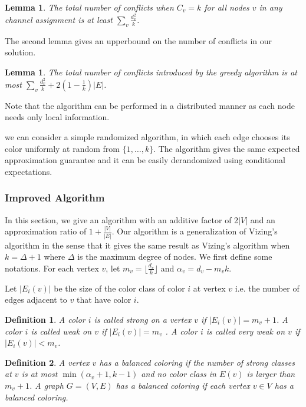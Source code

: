 \documentclass[titlepage, 11pt]{article}
\newtheorem{definition}{Definition}
\newtheorem{lemma}[theorem]{Lemma}
\begin{document}
\begin{lemma}
The total number of conflicts when $C_v = k$ for all nodes $v$ in any channel assignment
is at least
$    \sum_{v}\frac{d_v^2} {k} $.
\label{lemma:lower}
\end{lemma}

The second lemma gives an upperbound on the number of conflicts in our solution.
\begin{lemma}
The total number of conflicts introduced by the greedy algorithm is at most 
$    \sum_{v}\frac{d_v^2} {k} + 2(1 -\frac{1}{k})|E|$.
\label{lemma:upper}
\end{lemma}
Note that the algorithm can be performed in a distributed manner as each node needs only local information. 

 we can consider a simple randomized algorithm, in which each edge
chooses its color uniformly at random from $\{1, \dots, k\}$. 
The algorithm gives the same expected approximation guarantee and
it can be easily derandomized using conditional expectations.  \\



\subsubsection{Improved Algorithm}
\label{sec:improv}
In this section, we give an algorithm with an additive factor of 2$|V|$ and an approximation ratio of  $1 + \frac{|V|}{|E|}$. Our algorithm is a generalization of Vizing's algorithm in the sense that
it gives the same result as Vizing's algorithm  when $k = \Delta + 1$ where $\Delta$ is the maximum degree of nodes. 
We first define some notations. For each vertex $v$, let $m_v = \lfloor \frac{d_v}{k} \rfloor$ and $\alpha_v = d_v  -  m_vk $.

Let $|E_i(v)|$ be the size of the color class of color $i$ at vertex $v$ i.e. the number of edges adjacent to $v$ that have color $i$.

\begin{definition}
A color $i$ is called \emph{strong} on a vertex $v$ if $|E_i(v)|= m_v + 1$. A color $i$ is called weak on $v$ 
if $|E_i(v)| =  m_v$ . A color $i$ is called very weak on $v$ if $|E_i(v)| < m_v$.
\end{definition}
\begin{definition}
A vertex $v$ has a \emph{balanced} coloring if the number of strong classes at $v$ is at most $\min(\alpha_v + 1, k-1)$ and no color class in $E(v)$ is larger than $m_v + 1$. A graph $G = (V, E)$ has a balanced coloring if each vertex $v \in V$ has a balanced coloring.   
\end{definition}
\end{document}
